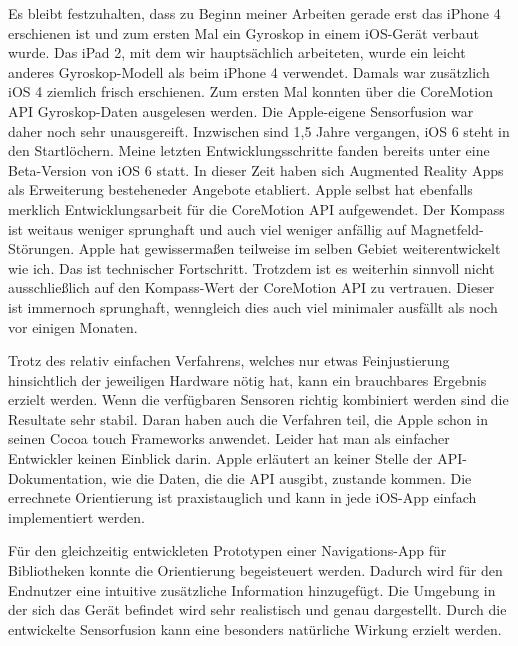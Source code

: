Es bleibt festzuhalten, dass zu Beginn meiner Arbeiten gerade erst das iPhone 4 erschienen ist und zum ersten Mal ein Gyroskop in einem iOS-Gerät verbaut wurde. Das iPad 2, mit dem wir hauptsächlich arbeiteten, wurde ein leicht anderes Gyroskop-Modell als beim iPhone 4 verwendet. Damals war zusätzlich iOS 4 ziemlich frisch erschienen. Zum ersten Mal konnten über die CoreMotion API Gyroskop-Daten ausgelesen werden. Die Apple-eigene Sensorfusion war daher noch sehr unausgereift. Inzwischen sind 1,5 Jahre vergangen, iOS 6 steht in den Startlöchern. Meine letzten Entwicklungsschritte fanden bereits unter eine Beta-Version von iOS 6 statt. In dieser Zeit haben sich Augmented Reality Apps als Erweiterung besteheneder Angebote etabliert. Apple selbst hat ebenfalls merklich Entwicklungsarbeit für die CoreMotion API aufgewendet. Der Kompass ist weitaus weniger sprunghaft und auch viel weniger anfällig auf Magnetfeld-Störungen. Apple hat gewissermaßen teilweise im selben Gebiet weiterentwickelt wie ich. Das ist technischer Fortschritt. Trotzdem ist es weiterhin sinnvoll nicht ausschließlich auf den Kompass-Wert der CoreMotion API zu vertrauen. Dieser ist immernoch sprunghaft, wenngleich dies auch viel minimaler ausfällt als noch vor einigen Monaten. 

Trotz des relativ einfachen Verfahrens, welches nur etwas Feinjustierung hinsichtlich der jeweiligen Hardware nötig hat, kann ein brauchbares Ergebnis erzielt werden. Wenn die verfügbaren Sensoren richtig kombiniert werden sind die Resultate sehr stabil. Daran haben auch die Verfahren teil, die Apple schon in seinen Cocoa touch Frameworks anwendet. Leider hat man als einfacher Entwickler keinen Einblick darin. Apple erläutert an keiner Stelle der API-Dokumentation, wie die Daten, die die API ausgibt, zustande kommen. Die errechnete Orientierung ist praxistauglich und kann in jede iOS-App einfach implementiert werden. 

Für den gleichzeitig entwickleten Prototypen einer Navigations-App für Bibliotheken konnte die Orientierung begeisteuert werden. Dadurch wird für den Endnutzer eine intuitive zusätzliche Information hinzugefügt. Die Umgebung in der sich das Gerät befindet wird sehr realistisch und genau dargestellt. Durch die entwickelte Sensorfusion kann eine besonders natürliche Wirkung erzielt werden.


